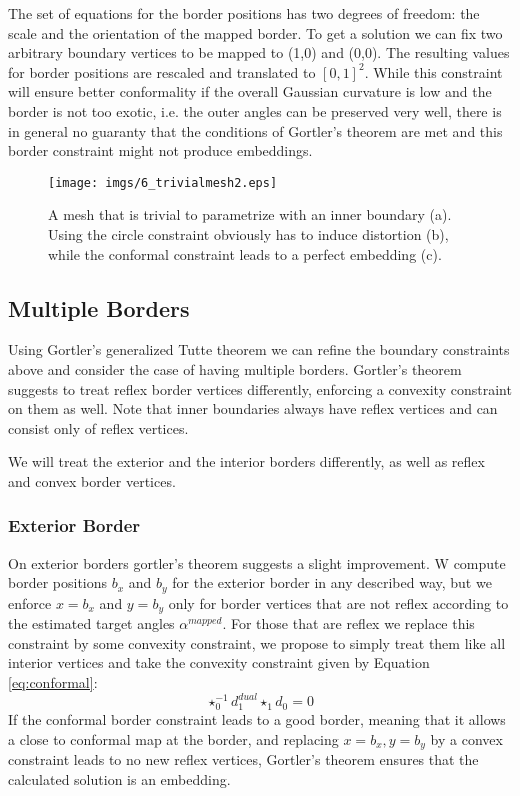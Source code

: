The set of equations for the border positions has two degrees of freedom: the scale and the orientation  of the mapped border. To get a solution we can fix two arbitrary boundary vertices to be mapped to  (1,0) and (0,0). The resulting values for border positions are rescaled and translated to $[0,1]^2$. While this constraint will ensure better conformality if the overall Gaussian curvature is low and the border is not too exotic, i.e. the outer angles can be preserved very well, there is in general no guaranty that the conditions of Gortler's theorem are met and this border constraint might not produce embeddings.

%

\begin{figure}%
\texttt{[image: imgs/6\_trivialmesh2.eps]}%
\caption{A mesh that is trivial to parametrize with an inner boundary (a). Using the circle constraint obviously has to induce distortion (b), while the conformal constraint leads to a perfect embedding (c).}%
\label{fig:6_trivialmesh}%
\end{figure}

\subsection{Multiple Borders}
Using Gortler's generalized Tutte theorem we can refine the boundary constraints above and consider the case of having multiple borders. Gortler's theorem suggests to treat reflex border vertices differently, enforcing a convexity constraint on them as well. Note that inner boundaries always have reflex vertices and can consist only of reflex vertices.  

We will treat the exterior and the interior borders differently, as well as reflex and convex border vertices. 

\subsubsection{Exterior Border}
On exterior borders gortler's theorem suggests a slight improvement.
W compute border positions $b_x$ and $b_y$ for the exterior border in any described way, but we enforce $x = b_x$ and $y= b_y$ only for border vertices that are not reflex according to the estimated target angles $\alpha^{mapped}$. For those that are reflex we replace this constraint by some convexity constraint, we propose to simply treat them like all interior vertices and take the convexity constraint given by Equation \ref{eq:conformal}:
\[\star_0^{-1} d_1^{dual} \star_1 d_0=0\]
If the conformal border constraint leads to a good border, meaning that it allows a close to conformal map at the border, and replacing $x=b_x, y=b_y$ by a convex constraint leads to no new reflex vertices, Gortler's theorem ensures that the calculated solution is an embedding.

